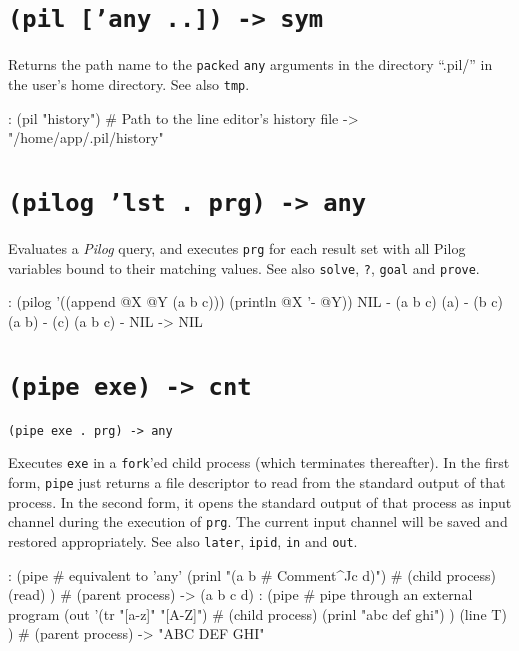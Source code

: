  
\section*{\texttt{(pil ['any ..]) -> sym}}
\label{sec:func-ref-P-(pil ['any ..]) -> sym}


Returns the path name to the \texttt{pack}ed \texttt{any} arguments in the directory
``.pil/'' in the user's home directory. See also \texttt{tmp}.


\begin{wideverbatim}
: (pil "history")  # Path to the line editor's history file
-> "/home/app/.pil/history"
\end{wideverbatim}

 
\section*{\texttt{(pilog 'lst . prg) -> any}}
\label{sec:func-ref-P-(pilog 'lst . prg) -> any}


Evaluates a \emph{Pilog} query, and executes \texttt{prg} for each
result set with all Pilog variables bound to their matching values. See
also \texttt{solve}, \texttt{?}, \texttt{goal} and \texttt{prove}.


\begin{wideverbatim}
: (pilog '((append @X @Y (a b c))) (println @X '- @Y))
NIL - (a b c)
(a) - (b c)
(a b) - (c)
(a b c) - NIL
-> NIL
\end{wideverbatim}

 
\section*{\texttt{(pipe exe) -> cnt}}
\label{sec:func-ref-P-(pipe exe) -> cnt}


\texttt{(pipe exe . prg) -> any}

Executes \texttt{exe} in a \texttt{fork}'ed child process (which terminates
thereafter). In the first form, \texttt{pipe} just returns a file descriptor to
read from the standard output of that process. In the second form, it
opens the standard output of that process as input channel during the
execution of \texttt{prg}. The current input channel will be saved and restored
appropriately. See also \texttt{later}, \texttt{ipid}, \texttt{in} and \texttt{out}.


\begin{wideverbatim}
: (pipe                                # equivalent to 'any'
   (prinl "(a b # Comment^Jc d)")         # (child process)
   (read) )                               # (parent process)
-> (a b c d)
: (pipe                                # pipe through an external program
   (out '(tr "[a-z]" "[A-Z]")             # (child process)
      (prinl "abc def ghi") )
   (line T) )                             # (parent process)
-> "ABC DEF GHI"
\end{wideverbatim}

